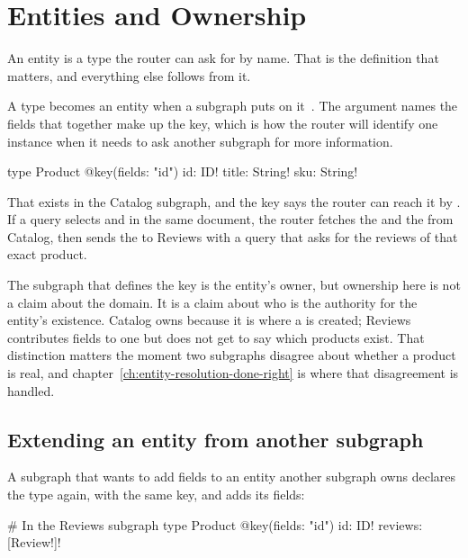 \section{Entities and Ownership}
\label{sec:ch06-entities-and-ownership}
%

An entity is a type the router can ask for by name. That is the definition that
matters, and everything else follows from it.

%
A type becomes an entity when a subgraph puts  on
it~\autocite{apollo2026entities}. The
 argument names the fields that together make up the key, which is
how the router will identify one instance when it needs to ask another subgraph
for more information.

\begin{graphqlsdl}
type Product @key(fields: "id") {
  id: ID!
  title: String!
  sku: String!
}
\end{graphqlsdl}

That  exists in the Catalog subgraph, and the key says the router
can reach it by . If a query selects  and
 in the same document, the router fetches the
 and the  from Catalog, then sends the  to Reviews
with a query that asks for the reviews of that exact product.

The subgraph that defines the key is the entity's owner, but ownership here is
not a claim about the domain. It is a claim about who is the authority for the
entity's existence. Catalog owns  because it is where a
 is created; Reviews contributes fields to one but does not get to
say which products exist. That distinction matters the moment two subgraphs
disagree about whether a product is real, and chapter~\ref{ch:entity-resolution-done-right}
is where that disagreement is handled.

\subsection*{Extending an entity from another subgraph}

%
A subgraph that wants to add fields to an entity another subgraph owns declares
the type again, with the same key, and adds its fields:

\begin{graphqlsdl}
# In the Reviews subgraph
type Product @key(fields: "id") {
  id: ID!
  reviews: [Review!]!
}
\end{graphqlsdl}

